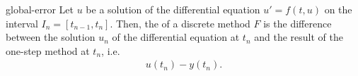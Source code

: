 \begin{Definition}{global-error}
  Let $u$ be a solution of the differential equation $u' = f(t,u)$
  on the interval $I_n = [t_{n-1}, t_{n}]$. Then, the  of a discrete method $F$ is the difference between the
  solution $u_n$ of the differential equation at $t_n$ and the result
  of the one-step method at $t_n$, i.e.
  \begin{gather} \label{eq:explicit:5a} %
    u(t_n) - y(t_n).
  \end{gather}
\end{Definition}

